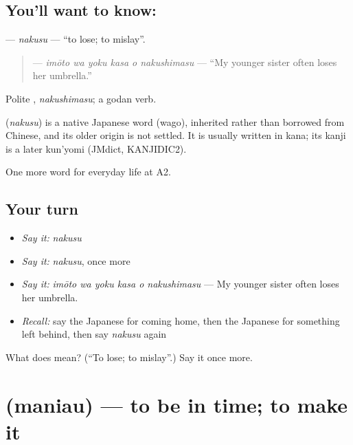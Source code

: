 \subsection*{You'll want to know: }
\textbf{} — \emph{nakusu} — \textquotedblleft{}to lose; to mislay\textquotedblright{}.

\begin{quote}
\textbf{   } — \emph{imōto wa yoku kasa o nakushimasu} — \textquotedblleft{}My younger sister often loses her umbrella.\textquotedblright{}
\end{quote}

Polite \textbf{}, \emph{nakushimasu}; a godan verb.

\begin{cousinweb}
\textbf{} (\emph{nakusu}) is a native Japanese word (wago), inherited rather than borrowed from Chinese, and its older origin is not settled. It is usually written in kana; its kanji is a later kun'yomi (JMdict, KANJIDIC2).
\end{cousinweb}

\begin{grammarlens}[title={What you've built}]
One more word for everyday life at A2.
\end{grammarlens}

\subsection*{Your turn}
\begin{itemize}
\raggedright
  \item \emph{Say it:} \emph{nakusu}
  \item \emph{Say it:} \emph{nakusu}, once more
  \item \emph{Say it:} \emph{imōto wa yoku kasa o nakushimasu} — My younger sister often loses her umbrella.
  \item \emph{Recall:} say the Japanese for coming home, then the Japanese for something left behind, then say \emph{nakusu} again
\end{itemize}

\begin{tcolorbox}[breakable,colback=teal!4,colframe=teal!35!black,title={Before you move on}]
What does  mean? (\textquotedblleft{}To lose; to mislay\textquotedblright{}.) Say it once more.
\end{tcolorbox}
\section[\texorpdfstring{\ja{まにあう} (maniau)}{まにあう (maniau)}]{ (maniau) — to be in time; to make it}

